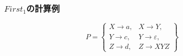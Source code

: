 \documentclass[dvipdfmx]{beamer}
\begin{document}
\begin{frame}
  \frametitle{$First_1$の計算例}
  \[
    P=\left\{\begin{array}{ll}
      X\rightarrow a, & X\rightarrow Y,           \\
      Y\rightarrow c, & Y\rightarrow \varepsilon, \\
      Z\rightarrow d, & Z\rightarrow XYZ
    \end{array}
    \right\}
  \]

  \begin{center}
    \scalebox{0.65}{
}
\end{center}
\end{frame}
\end{document}
